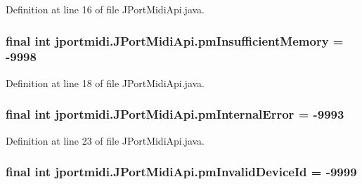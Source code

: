 Definition at line 16 of file J\+Port\+Midi\+Api.\+java.

\subsubsection[{\texorpdfstring{pm\+Insufficient\+Memory}{pmInsufficientMemory}}]{\setlength{\rightskip}{0pt plus 5cm}final {\bf int} jportmidi.\+J\+Port\+Midi\+Api.\+pm\+Insufficient\+Memory = -\/9998}\hypertarget{classjportmidi_1_1_j_port_midi_api_a9b8e5a759eac1269b71fb13b4d433b2f}{}\label{classjportmidi_1_1_j_port_midi_api_a9b8e5a759eac1269b71fb13b4d433b2f}


Definition at line 18 of file J\+Port\+Midi\+Api.\+java.

\subsubsection[{\texorpdfstring{pm\+Internal\+Error}{pmInternalError}}]{\setlength{\rightskip}{0pt plus 5cm}final {\bf int} jportmidi.\+J\+Port\+Midi\+Api.\+pm\+Internal\+Error = -\/9993}\hypertarget{classjportmidi_1_1_j_port_midi_api_a37c437fc2bea8b5dc95262410d24b898}{}\label{classjportmidi_1_1_j_port_midi_api_a37c437fc2bea8b5dc95262410d24b898}


Definition at line 23 of file J\+Port\+Midi\+Api.\+java.

\subsubsection[{\texorpdfstring{pm\+Invalid\+Device\+Id}{pmInvalidDeviceId}}]{\setlength{\rightskip}{0pt plus 5cm}final {\bf int} jportmidi.\+J\+Port\+Midi\+Api.\+pm\+Invalid\+Device\+Id = -\/9999}\hypertarget{classjportmidi_1_1_j_port_midi_api_ab718d87cb02cf0ca88506c5ac01d70d3}{}\label{classjportmidi_1_1_j_port_midi_api_ab718d87cb02cf0ca88506c5ac01d70d3}


